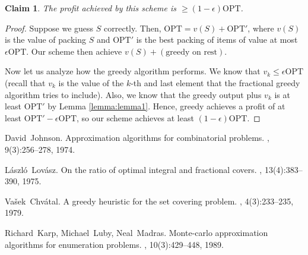 \documentclass[11pt]{article}
\newtheorem{claim}[theorem]{Claim}
\theoremstyle{definition}
\theoremstyle{remark}
\begin{document}
\begin{claim}
    The profit achieved by this scheme is  $\geq (1-\epsilon) \mathrm{OPT}$.
\end{claim}
\begin{proof}
    Suppose we guess $S$ correctly.
    Then, $\mathrm{OPT} = v(S) + \mathrm{OPT}'$,
    where $v(S)$ is the value of packing $S$ and $\mathrm{OPT}'$ is the best packing of items of value at most $\epsilon \mathrm{OPT}$.
    Our scheme then achieve $v(S) + (\text{greedy on rest})$.

    Now let us analyze how the greedy algorithm performs. We know that $v_k \leq \epsilon \mathrm{OPT}$
    (recall that $v_k$ is the value of the $k$-th and last element that the fractional greedy algorithm tries to include).
    Also, we know that the greedy output plus $v_k$ is at least $\mathrm{OPT}'$ by Lemma \ref{lemma:lemma1}.
    Hence, greedy achieves a profit of at least $ \mathrm{OPT}' - \epsilon \mathrm{OPT}$,
    so our scheme achieves at least $(1-\epsilon)\mathrm{OPT}$.
\end{proof}


\begin{thebibliography}{42}

David~Johnson.
\newblock Approximation algorithms for combinatorial problems.
, 9(3):256--278, 1974.

    L\'{a}szl\'{o}~Lov\'{a}sz.
\newblock On the ratio of optimal integral and fractional covers.
, 13(4):383--390, 1975.

    Va\v{s}ek~Chv\'{a}tal.
\newblock A greedy heuristic for the set covering problem.
, 4(3):233--235, 1979.

    Richard~Karp, Michael~Luby, Neal~Madras.
\newblock Monte-carlo approximation algorithms for enumeration problems.
, 10(3):429--448, 1989.
\end{thebibliography}
\end{document}
